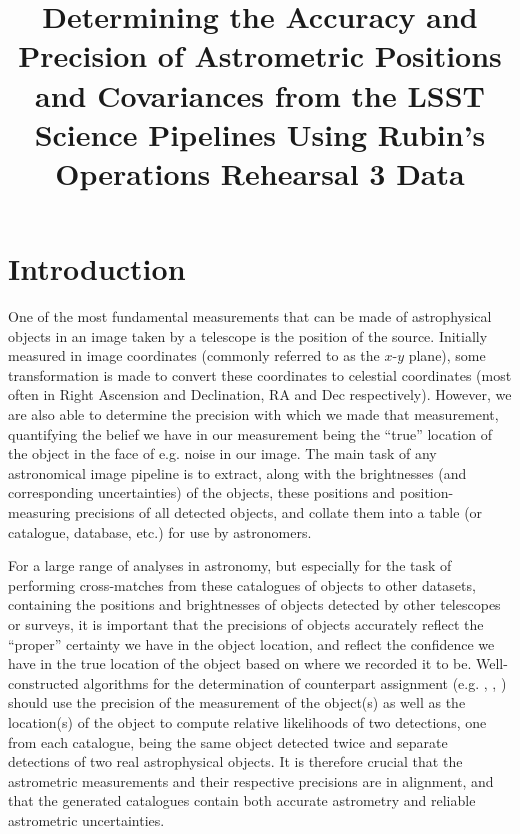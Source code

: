 \documentclass[SE,lsstdraft,authoryear,toc]{lsstdoc}
\title[Determining the Accuracy and Precision of LSST Astrometric Positions and Covariances]{Determining the Accuracy and Precision of Astrometric Positions and Covariances from the LSST Science Pipelines Using Rubin's Operations Rehearsal 3 Data}
\date{\vcsDate}
\begin{document}
\maketitle

\section{Introduction}
\label{sec:intro}
One of the most fundamental measurements that can be made of astrophysical objects in an image taken by a telescope is the position of the source.
Initially measured in image coordinates (commonly referred to as the $x$-$y$ plane), some transformation is made to convert these coordinates to celestial coordinates (most often in Right Ascension and Declination, RA and Dec respectively).
However, we are also able to determine the precision with which we made that measurement, quantifying the belief we have in our measurement being the ``true'' location of the object in the face of e.g. noise in our image.
The main task of any astronomical image pipeline is to extract, along with the brightnesses (and corresponding uncertainties) of the objects, these positions and position-measuring precisions of all detected objects, and collate them into a table (or catalogue, database, etc.) for use by astronomers.

For a large range of analyses in astronomy, but especially for the task of performing cross-matches from these catalogues of objects to other datasets, containing the positions and brightnesses of objects detected by other telescopes or surveys, it is important that the precisions of objects accurately reflect the ``proper'' certainty we have in the object location, and reflect the confidence we have in the true location of the object based on where we recorded it to be.
Well-constructed algorithms for the determination of counterpart assignment (e.g. \citealp{Budavari:2008aa}, \citealp{2018MNRAS.473.5570W}, \citealp{Pineau:2017aa}) should use the precision of the measurement of the object(s) as well as the location(s) of the object to compute relative likelihoods of two detections, one from each catalogue, being the same object detected twice and separate detections of two real astrophysical objects.
It is therefore crucial that the astrometric measurements and their respective precisions are in alignment, and that the generated catalogues contain both accurate astrometry and reliable astrometric uncertainties.
\end{document}
